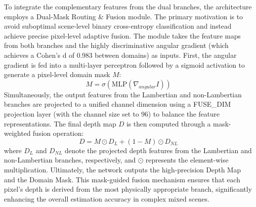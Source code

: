 \documentclass[lettersize,journal]{IEEEtran}
\begin{document}
To integrate the complementary features from the dual branches, the architecture employs a Dual-Mask Routing \& Fusion module. The primary motivation is to avoid suboptimal scene-level binary cross-entropy classification and instead achieve precise pixel-level adaptive fusion. The module takes the feature maps from both branches and the highly discriminative angular gradient (which achieves a Cohen's d of 0.983 between domains) as inputs. First, the angular gradient is fed into a multi-layer perceptron followed by a sigmoid activation to generate a pixel-level domain mask $M$:
\begin{equation}
M = \sigma(\text{MLP}(\nabla_{angular} I))
\end{equation}
Simultaneously, the output features from the Lambertian and non-Lambertian branches are projected to a unified channel dimension using a FUSE\_DIM projection layer (with the channel size set to 96) to balance the feature representations. The final depth map $D$ is then computed through a mask-weighted fusion operation:
\begin{equation}
D = M \odot D_L + (1 - M) \odot D_{NL}
\end{equation}
where $D_L$ and $D_{NL}$ denote the projected depth features from the Lambertian and non-Lambertian branches, respectively, and $\odot$ represents the element-wise multiplication. Ultimately, the network outputs the high-precision Depth Map and the Domain Mask. This mask-guided fusion mechanism ensures that each pixel's depth is derived from the most physically appropriate branch, significantly enhancing the overall estimation accuracy in complex mixed scenes.
\end{document}
